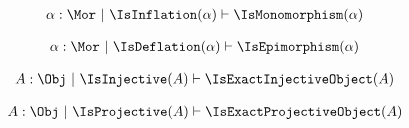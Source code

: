 \begin{sequent}
\begin{align*}
  \alpha:\Mor ~|~ \IsInflation( \alpha ) \vdash \IsMonomorphism( \alpha )
\end{align*}
\end{sequent}

\begin{sequent}
\begin{align*}
  \alpha:\Mor ~|~ \IsDeflation( \alpha ) \vdash \IsEpimorphism( \alpha )
\end{align*}
\end{sequent}

\begin{sequent}
  \begin{align*}
    A:\Obj ~|~ \IsInjective( A ) \vdash \IsExactInjectiveObject( A )
  \end{align*}
\end{sequent}
  
\begin{sequent}
    \begin{align*}
      A:\Obj ~|~ \IsProjective( A ) \vdash \IsExactProjectiveObject( A )
    \end{align*}
\end{sequent}


